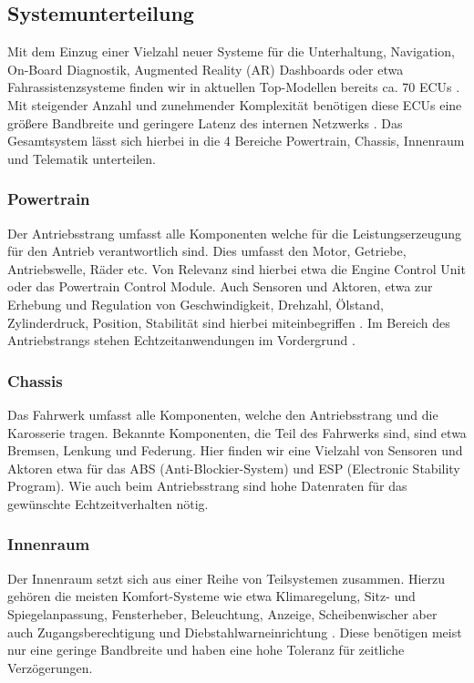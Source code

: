     \subsection{Systemunterteilung}
    Mit dem Einzug einer Vielzahl neuer Systeme für die Unterhaltung, Navigation, On-Board Diagnostik,
    Augmented Reality (AR) Dashboards oder etwa Fahrassistenzsysteme finden wir in aktuellen Top-Modellen bereits 
    ca. 70 ECUs \cite{ivn quellen}. Mit steigender Anzahl und zunehmender Komplexität 
    benötigen diese ECUs eine größere Bandbreite und geringere Latenz des internen Netzwerks \cite{TW_huang2018vehicle}.
    Das Gesamtsystem lässt sich hierbei in die 4 Bereiche Powertrain, Chassis, Innenraum und Telematik unterteilen.
        \subsubsection{Powertrain}
        Der Antriebsstrang umfasst alle Komponenten welche für die Leistungserzeugung für den Antrieb verantwortlich sind. Dies umfasst 
        den Motor, Getriebe, Antriebswelle, Räder etc. Von Relevanz sind hierbei etwa die Engine Control Unit oder das Powertrain Control Module.
        Auch Sensoren und Aktoren, etwa zur Erhebung und Regulation von Geschwindigkeit, Drehzahl, Ölstand, Zylinderdruck, Position, Stabilität sind hierbei miteinbegriffen \cite{IVN}.
        Im Bereich des Antriebstrangs stehen Echtzeitanwendungen im Vordergrund \cite{reif2011bosch}.
        \subsubsection{Chassis}
        Das Fahrwerk umfasst alle Komponenten, welche den Antriebsstrang und die Karosserie tragen. Bekannte Komponenten, die Teil des Fahrwerks sind, sind etwa
        Bremsen, Lenkung und Federung. Hier finden wir eine Vielzahl von Sensoren und Aktoren etwa für das ABS (Anti-Blockier-System) und ESP (Electronic Stability Program).
        Wie auch beim Antriebsstrang sind hohe Datenraten für das gewünschte Echtzeitverhalten nötig.
        \subsubsection{Innenraum}
        Der Innenraum setzt sich aus einer Reihe von Teilsystemen zusammen. Hierzu gehören die meisten Komfort-Systeme wie etwa Klimaregelung, Sitz- und Spiegelanpassung, Fensterheber, Beleuchtung,
        Anzeige, Scheibenwischer aber auch Zugangsberechtigung und Diebstahlwarneinrichtung \cite{reif2011bosch}. 
        Diese benötigen meist nur eine geringe Bandbreite und haben eine hohe Toleranz für zeitliche Verzögerungen.
